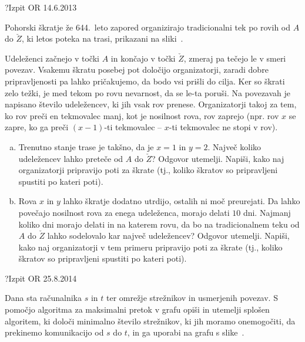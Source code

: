 \begin{naloga}{?}{Izpit OR 14.6.2013}
\begin{vprasanje}[rovi]
Pohorski škratje že 644.~leto zapored
organizirajo tradicionalni tek po rovih od $A$ do $\check{Z}$,
ki letos poteka na trasi, prikazani na sliki~\fig{}.

Udeleženci začnejo v točki $A$ in končajo v točki $\check{Z}$,
zmeraj pa tečejo le v smeri povezav.
Vsakemu škratu posebej pot določijo organizatorji,
zaradi dobre pripravljenosti pa lahko pričakujemo,
da bodo vsi prišli do cilja.
Ker so škrati zelo težki,
je med tekom po rovu nevarnost, da se le-ta poruši.
Na povezavah je napisano število udeležencev, ki jih vsak rov prenese.
Organizatorji takoj za tem, ko rov preči en tekmovalec manj,
kot je nosilnost rova, rov zaprejo
(npr. rov $x$ se zapre, ko ga preči $(x-1)$-ti tekmovalec
-- $x$-ti tekmovalec ne stopi v rov).

\begin{enumerate}[(a)]
\item Trenutno stanje trase je takšno, da je $x = 1$ in $y = 2$.
Največ koliko udeležencev lahko preteče od $A$ do $\check{Z}$?
Odgovor utemelji.
Napiši, kako naj organizatorji pripravijo poti za škrate
(tj., koliko škratov so pripravljeni spustiti po kateri poti).

\item Rova $x$ in $y$ lahko škratje dodatno utrdijo,
ostalih ni moč preurejati.
Da lahko povečajo nosilnost rova za enega udeleženca, morajo delati $10$ dni.
Najmanj koliko dni morajo delati in na katerem rovu,
da bo na tradicionalnem teku od $A$ do $\check{Z}$
lahko sodelovalo kar največ udeležencev?
Odgovor utemelji.
Napiši, kako naj organizatorji v tem primeru pripravijo poti za škrate
(tj., koliko škratov so pripravljeni spustiti po kateri poti).
\end{enumerate}

\begin{slika}
\pgfslika
{}
\end{slika}
\end{vprasanje}
\begin{odgovor}
\end{odgovor}
\end{naloga}


\begin{naloga}{?}{Izpit OR 25.8.2014}
\begin{vprasanje}[strezniki]
Dana sta računalnika $s$ in $t$ ter omrežje strežnikov
in usmerjenih povezav.
S pomočjo algoritma za maksimalni pretok v grafu
opiši in utemelji splošen algoritem,
ki določi minimalno število strežnikov, ki jih moramo onemogočiti,
da prekinemo komunikacijo od $s$ do $t$,
in ga uporabi na grafu s slike~\fig{}.

\begin{slika}
\pgfslika
{}
\end{slika}
\end{vprasanje}
\begin{odgovor}
\end{odgovor}
\end{naloga}
